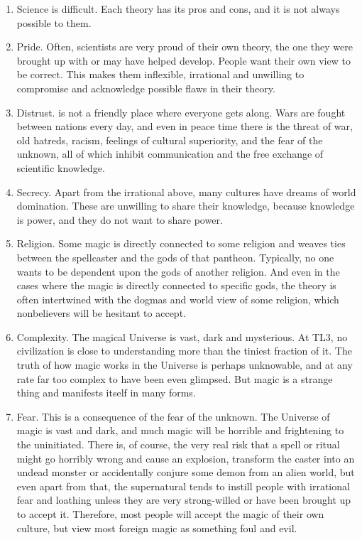 \begin{enumerate}
  \item Science is difficult. 
    Each theory has its pros and cons, and it is not always possible to  them. 
  \item Pride. 
    Often, scientists are very proud of their own theory, the one they were brought up with or may have helped develop. People want their own view to be correct. This makes them inflexible, irrational and unwilling to compromise and acknowledge possible flaws in their theory. 
  \item Distrust. 
    \Miith{} is not a friendly place where everyone gets along. Wars are fought between nations every day, and even in peace time there is the threat of war, old hatreds, racism, feelings of cultural superiority, and the fear of the unknown, all of which inhibit communication and the free exchange of scientific knowledge. 
  \item Secrecy. 
    Apart from the irrational  above, many cultures have dreams of world domination. These are unwilling to share their knowledge, because knowledge is power, and they do not want to share power. 
  \item Religion. 
    Some magic is directly connected to some religion and weaves ties between the spellcaster and the gods of that pantheon. Typically, no one wants to be dependent upon the gods of another religion. And even in the cases where the magic is directly connected to specific gods, the theory is often intertwined with the dogmas and world view of some religion, which nonbelievers will be hesitant to accept. 
  \item Complexity. 
    The magical Universe is vast, dark and mysterious. At TL3, no civilization is close to understanding more than the tiniest fraction of it. The truth of how magic works in the Universe is perhaps unknowable, and at any rate far too complex to have been even glimpsed. But magic is a strange thing and manifests itself in many forms. 
  \item Fear. 
    This is a consequence of the fear of the unknown. The Universe of magic is vast and dark, and much magic will be horrible and frightening to the uninitiated. There is, of course, the very real risk that a spell or ritual might go horribly wrong and cause an explosion, transform the caster into an undead monster or accidentally conjure some demon from an alien world, but even apart from that, the supernatural tends to instill people with irrational fear and loathing unless they are very strong-willed or have been brought up to accept it. Therefore, most people will accept the magic of their own culture, but view most foreign magic as something foul and evil. 
\end{enumerate}

